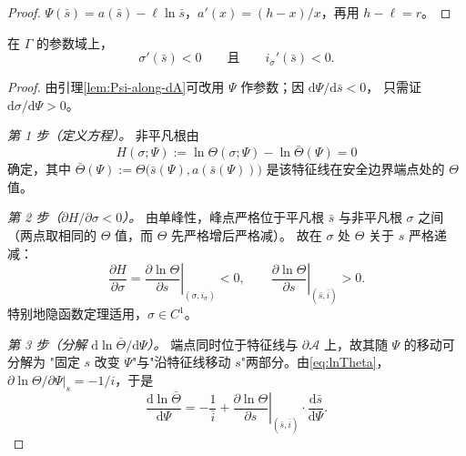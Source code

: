 \begin{proof}
$\Psi(\bar s)=a(\bar s)-\ell\ln\bar s$，$a'(x)=(h-x)/x$，再用 $h-\ell=r$。
\end{proof}

\begin{proposition}[切换曲线参数化的严格单调性]
\label{prop:sigma-monotone}
在 $\Gamma$ 的参数域上，
\begin{equation}
  \sigma'(\bar s)<0
  \qquad\text{且}\qquad
  i_\sigma'(\bar s)<0 .
  \label{eq:sigma-monotone}
\end{equation}
\end{proposition}

\begin{proof}
由引理\ref{lem:Psi-along-dA}可改用 $\Psi$ 作参数；因 $\mathrm{d}\Psi/\mathrm{d}\bar s<0$，
只需证 $\mathrm{d}\sigma/\mathrm{d}\Psi>0$。

\emph{第 1 步（定义方程）。} 非平凡根由
\begin{equation}
  H(\sigma;\Psi):=\ln\Theta(\sigma;\Psi)-\ln\bar\Theta(\Psi)=0
  \label{eq:H-def}
\end{equation}
确定，其中 $\bar\Theta(\Psi):=\Theta\bigl(\bar s(\Psi),a(\bar s(\Psi))\bigr)$
是该特征线在安全边界端点处的 $\Theta$ 值。

\emph{第 2 步（$\partial H/\partial\sigma<0$）。}
由单峰性，峰点严格位于平凡根 $\bar s$ 与非平凡根 $\sigma$ 之间
（两点取相同的 $\Theta$ 值，而 $\Theta$ 先严格增后严格减）。
故在 $\sigma$ 处 $\Theta$ 关于 $s$ 严格递减：
\begin{equation}
  \frac{\partial H}{\partial\sigma}
  =\left.\frac{\partial\ln\Theta}{\partial s}\right|_{(\sigma,i_\sigma)}<0,
  \qquad
  \left.\frac{\partial\ln\Theta}{\partial s}\right|_{(\bar s,\bar i)}>0 .
  \label{eq:H-sigma-sign}
\end{equation}
特别地隐函数定理适用，$\sigma\in C^1$。

\emph{第 3 步（分解 $\mathrm{d}\ln\bar\Theta/\mathrm{d}\Psi$）。}
端点同时位于特征线与 $\partial\mathcal{A}$ 上，故其随 $\Psi$ 的移动可分解为
"固定 $s$ 改变 $\Psi$"与"沿特征线移动 $s$"两部分。由\eqref{eq:lnTheta}，
$\partial\ln\Theta/\partial\Psi|_{s}=-1/i$，于是
\begin{equation}
  \frac{\mathrm{d}\ln\bar\Theta}{\mathrm{d}\Psi}
  =-\frac{1}{\bar i}
  +\left.\frac{\partial\ln\Theta}{\partial s}\right|_{(\bar s,\bar i)}
   \cdot\frac{\mathrm{d}\bar s}{\mathrm{d}\Psi}.
  \label{eq:dlnThetabar}
\end{equation}


\end{proof}
